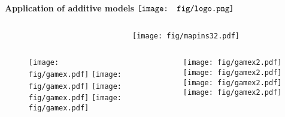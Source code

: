 \documentclass{beamer}
\begin{document}
\begin{frame}{\textbf{Application of additive models} \hspace{0pt plus 1 filll} $\vcenter{\hbox{\texttt{[image: fig/logo.png]}}}$}
\vfill
\begin{columns}
\begin{column}{0.75\textwidth}
\begin{figure}
\raggedright
\begin{overprint}
\end{overprint}
\end{figure}
\end{column}
\begin{column}{0.1\textwidth}
\texttt{[image: fig/mapins32.pdf]}
\end{column}
\end{columns}
\vspace{-0.1in}
\begin{columns}
\begin{column}{0.5\textwidth}
\begin{figure}
\begin{overprint}
\texttt{[image: fig/gamex.pdf]}
\texttt{[image: fig/gamex.pdf]}
\texttt{[image: fig/gamex.pdf]}
\texttt{[image: fig/gamex.pdf]}
\end{overprint}
\end{figure}
\end{column}
\begin{column}{0.5\textwidth}
\begin{figure}
\begin{overprint}
\texttt{[image: fig/gamex2.pdf]}
\texttt{[image: fig/gamex2.pdf]}
\texttt{[image: fig/gamex2.pdf]}
\texttt{[image: fig/gamex2.pdf]}
\end{overprint}
\end{figure}
\end{column}
\end{columns}
\vfill
\end{frame}
\end{document}
